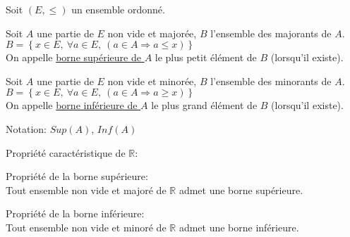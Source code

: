 \documentclass[12pt,twoside,a4paper]{article}
\begin{document}
		\begin{defi}
			Soit $(E,\leqslant)$ un ensemble ordonn\'e.
			\begin{liste}
				\item Soit $A$ une partie de $E$ non vide et major\'ee, $B$ l'ensemble des majorants de $A$.\\
					$B=\left\{x\in E,\ \forall a\in E,\ (a\in A\Rightarrow a\leqslant x) \right\}$\\
					On appelle \underline{borne sup\'erieure de $A$} le plus petit \'el\'ement de $B$ (lorsqu'il existe).
				\item  Soit $A$ une partie de $E$ non vide et minor\'ee, $B$ l'ensemble des minorants de $A$.\\
					$B=\left\{x\in E,\ \forall a\in E,\ (a\in A\Rightarrow a\geqslant x) \right\}$\\
					On appelle \underline{borne inf\'erieure de $A$} le plus grand \'el\'ement de $B$ (lorsqu'il existe).
			\end{liste}
		\end{defi}
		Notation: $Sup(A)$, $Inf(A)$\\
		\begin{prop}
			Propri\'et\'e caract\'eristique de $\mathbb{R}$:
			\begin{liste}
				\item Propri\'et\'e de la borne sup\'erieure:\\
					Tout ensemble non vide et major\'e de $\mathbb{R}$ admet une borne sup\'erieure.
				\item Propri\'et\'e de la borne inf\'erieure:\\
					Tout ensemble non vide et minor\'e de $\mathbb{R}$ admet une borne inf\'erieure.
			\end{liste}
		\end{prop}
\end{document}
